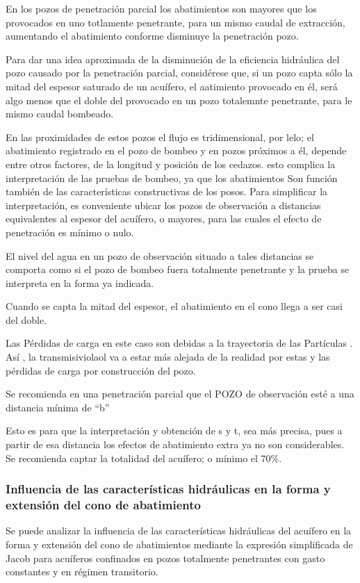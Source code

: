 En los pozos de penetración parcial los abatimientos son mayores que los provocados en uno totlamente penetrante, para un mismo caudal de extracción, aumentando el abatimiento conforme disminuye la penetración pozo.

Para dar una idea aproximada de la disminución de la eficiencia hidráulica del pozo causado por la penetración parcial, considérese que, si un pozo capta sólo la mitad del espesor saturado de un acuífero, el aatimiento provocado en él, será algo menos que el doble del provocado en un pozo totalemnte penetrante, para le mismo caudal bombeado.

En las proximidades de estos pozos el flujo es tridimensional, por lelo; el abatimiento registrado en el pozo de bombeo y en pozos próximos a él, depende entre otros factores, de la longitud y posición de los cedazos. esto complica la interpretación de las pruebas de bombeo, ya que los abatimientos Son función también de las características constructivas de los posos. Para simplificar la interpretación, es conveniente ubicar los pozos de observación a distancias equivalentes al espesor del acuífero, o mayores, para las cuales el efecto de penetración es mínimo o nulo.

El nivel del agua en un pozo de observación situado a tales distancias se comporta como si el pozo de bombeo fuera totalmente penetrante y la prueba se interpreta en la forma ya indicada.

Cuando se capta la mitad del espesor, el abatimiento en el cono llega a ser casi del doble.

Las Pérdidas de carga en este caso son debidas a la trayectoria de las Partículas . Así , la transmisiviolaol va a estar más alejada de la realidad por estas y las pérdidas de carga por construcción del pozo.

Se recomienda en una penetración parcial que el POZO de observación esté a una distancia mínima de ``b''

Esto es para que la interpretación y obtención de s y t, sea más precisa, pues a partir de esa distancia los efectos de abatimiento extra ya no son considerables. Se recomienda captar la totalidad del acuífero; o mínimo el 70\%.
\subsubsection{Influencia de las características hidráulicas en la forma y extensión del cono de abatimiento}
Se puede analizar la influencia de las características hidráulicas del acuífero en la forma y extensión del cono de abatimientos mediante la expresión simplificada de Jacob para acuíferos confinados en pozos totalmente penetrantes con gasto constantes y en régimen transitorio.

